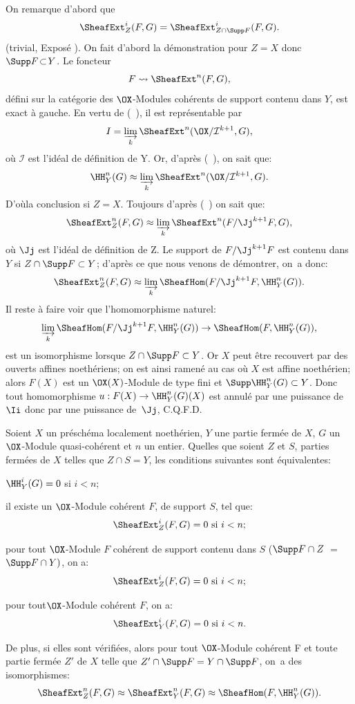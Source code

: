 On remarque d'abord que
\[
\SheafExt^i_Z(F, G) = \SheafExt^i_{Z \cap \Supp F}(F, G).
\]
(trivial, \cf Expos\'e ). On fait d'abord la d\'emonstration pour $Z \!=\! X$ donc \hbox{$\Supp F \!\subset\! Y$}. Le foncteur
\[F \rightsquigarrow \SheafExt^n(F, G),
\]
d\'efini sur la cat\'egorie des $\OX$-Modules coh\'erents de support contenu dans $Y$, est exact \`a gauche. En vertu de (~), il est repr\'esentable par
\[I = \varinjlim_{k} \SheafExt^n (\OX/\mathcal{I}^{k+1}, G),
\]
o\`u $\mathcal{I}$ est l'id\'eal de d\'efinition de Y. Or, d'apr\`es (~), on sait que:
\[
\HH^n_Y(G) \approx \varinjlim_{k} \SheafExt^n (\OX/\mathcal{I}^{k+1}, G).
\]
D'o\`u\pageoriginale la conclusion si $ Z= X$. Toujours d'apr\`es (~) on sait que:
\[
\SheafExt^n_Z (F, G) \approx \varinjlim_{k} \SheafExt^n (F/\Jj^{k + 1}F, G),
\]
o\`u $\Jj$ est l'id\'eal de d\'efinition de Z. Le support de $F/\Jj^{k+1}F$ est contenu dans $Y$ si $Z \cap \Supp F \subset Y$; d'apr\`es ce que nous venons de d\'emontrer, on~a donc:
\[
\SheafExt^n_Z (F, G) \approx \varinjlim_{k} \SheafHom (F/\Jj^{k + 1}F, \HH^n_Y(G)).
\]
Il reste \`a faire voir que l'homomorphisme naturel:
\[
\varinjlim_{k} \SheafHom (F/\Jj^{k + 1}F, \HH^n_Y(G)) \to \SheafHom (F, \HH^n_Y (G)),
\]
est un isomorphisme lorsque $Z \cap \Supp F \subset Y$. Or $X$ peut \^etre recouvert par des ouverts affines noeth\'eriens; on est ainsi ramen\'e au cas o\`u $X$ est affine noeth\'erien; alors $F(X)$ est un $\OX(X)$-Module de type fini et $\Supp \HH^n_Y(G) \subset Y$. Donc tout homomorphisme \hbox{$u: F(X) \to \HH^n_Y (G) (X)$} est annul\'e par une puissance de $\Ii$ donc par une puissance de~$\Jj$, C.Q.F.D.

\begin{proposition} \label{VII.1.2}
Soient $X$ un pr\'esch\'ema localement noeth\'erien, $Y$ une partie ferm\'ee de $X$, $G$ un $\OX$-Module quasi-coh\'erent et $n$ un entier. Quelles que soient $Z$ et $S$, parties ferm\'ees de $X$ telles que $Z \cap S = Y$, les conditions suivantes sont \'equivalentes:
\begin{enumeratei}
\item
$\HH^i_Y (G) = 0$ si $i<n$;

\item
il existe un $\OX$-Module coh\'erent $F$, de support $S$, tel que:
\[
\SheafExt^i_Z (F, G) = 0 \text{ si } i<n;\]

\item
pour tout $\OX$-Module $F$ coh\'erent de support contenu dans $S$ (\ie $\Supp F \cap Z$ $=$ $\Supp F \cap Y)$, on a:
\[
\SheafExt^i_{Z}(F, G) = 0 \text{ si } i < n;
\]
\item
pour tout\pageoriginale $\OX$-Module coh\'erent $F$, on a:
\[
\SheafExt^i_Y (F, G) = 0 \text{ si } i < n.
\]
\end{enumeratei}
\noindent
De plus, si elles sont v\'erifi\'ees, alors pour tout $\OX$-Module coh\'erent F et toute partie ferm\'ee $Z'$ de $X$ telle que $Z' \cap \Supp F = Y \cap \Supp F$, on~a des isomorphismes:
\[
\SheafExt^n_{Z} (F, G) \approx \SheafExt^n_Y (F, G) \approx \SheafHom (F, \HH^n_Y (G)).
\]
\end{proposition}

